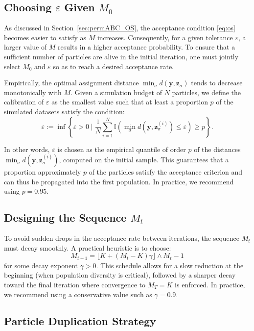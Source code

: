 \documentclass[lineno]{biometrika}
\def\obsdata{\mathbf{y}}
\def\simdata{\mathbf{z}}
\begin{document}
\subsection{Choosing \( \varepsilon \) Given \( M_0 \)}

As discussed in Section~\ref{sec:permABC_OS}, the acceptance condition \eqref{eq:os} becomes easier to satisfy as \( M \) increases. Consequently, for a given tolerance \( \varepsilon \), a larger value of \( M \) results in a higher acceptance probability. To ensure that a sufficient number of particles are alive in the initial iteration, one must jointly select \( M_0 \) and \( \varepsilon \) so as to reach a desired acceptance rate.

Empirically, the optimal assignment distance \( \min_{\sigma} d(\obsdata, \simdata_\sigma) \) tends to decrease monotonically with \( M \). Given a simulation budget of \( N \) particles, we define the calibration of \( \varepsilon \) as the smallest value such that at least a proportion \( p \) of the simulated datasets satisfy the condition:
\[
\varepsilon := \inf \left\{ \varepsilon > 0 \mid \frac{1}{N} \sum_{i=1}^N \mathbb{I} \left( \min_\sigma d(\obsdata, \simdata^{(i)}_\sigma) \leq \varepsilon \right) \geq p \right\}.
\]

In other words, \( \varepsilon \) is chosen as the empirical quantile of order \( p \) of the distances \( \min_\sigma d(\obsdata, \simdata^{(i)}_\sigma) \), computed on the initial sample. This guarantees that a proportion approximately $p$ of the particles satisfy the acceptance criterion and can thus be propagated into the first population. In practice, we recommend using \( p = 0.95 \).

\subsection{Designing the Sequence \( M_t \)}

To avoid sudden drops in the acceptance rate between iterations, the sequence \( M_t \) must decay smoothly. A practical heuristic is to choose:
\[
M_{t+1} = \lfloor K + (M_t - K) \gamma \rfloor \wedge M_t -1
\]
for some decay exponent \( \gamma > 0 \). This schedule allows for a slow reduction at the beginning (when population diversity is critical), followed by a sharper decay toward the final iteration where convergence to \( M_T = K \) is enforced. In practice, we recommend using a conservative value such as \( \gamma = 0.9 \).

\subsection{Particle Duplication Strategy}
\end{document}
